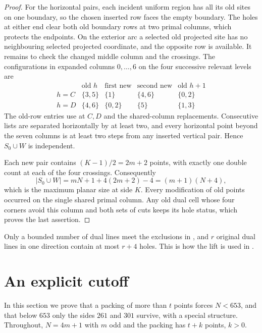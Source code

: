 \documentclass[11pt,colorlinks]{charlie}
\begin{document}
\begin{proof}
For the horizontal pairs, each incident uniform region has all its old sites on one boundary, so the chosen inserted row faces the empty boundary. The holes at either end clear both old boundary rows at two primal columns, which protects the endpoints. On the exterior arc a selected old projected site has no neighbouring selected projected coordinate, and the opposite row is available. It remains to check the changed middle column and the crossings. The configurations in expanded columns $0,\ldots,6$ on the four successive relevant levels are
\[
\begin{array}{c|cccc}
&\text{old }h&\text{first new}&\text{second new}&\text{old }h+1\\ \hline
h=C&\{3,5\}&\{1\}&\{4,6\}&\{0,2\}\\
h=D&\{4,6\}&\{0,2\}&\{5\}&\{1,3\}
\end{array}
\]
The old-row entries use \cite[Lemma~16]{BHNlong} at $C,D$ and the shared-column replacements. Consecutive lists are separated horizontally by at least two, and every horizontal point beyond the seven columns is at least two steps from any inserted vertical pair. Hence $S_0\cup W$ is independent.

Each new pair contains $(K-1)/2=2m+2$ points, with exactly one double count at each of the four crossings. Consequently
\[
 |S_0\cup W|=mN+1+4(2m+2)-4=(m+1)(N+4),
\]
which is the maximum planar size at side $K$. Every modification of old points occurred on the single shared primal column. Any old dual cell whose four corners avoid this column and both sets of cuts keeps its hole status, which proves the last assertion.
\end{proof}

Only a bounded number of dual lines meet the exclusions in , and $r$ original dual lines in one direction contain at most $r+4$ holes. This is how the lift is used in .

\section{An explicit cutoff}\label{sec:cutoff}

In this section we prove that a packing of more than $t$ points forces $N<653$, and that below $653$ only the sides $261$ and $301$ survive, with a special structure. Throughout, $N=4m+1$ with $m$ odd and the packing has $t+k$ points, $k>0$.
\end{document}
